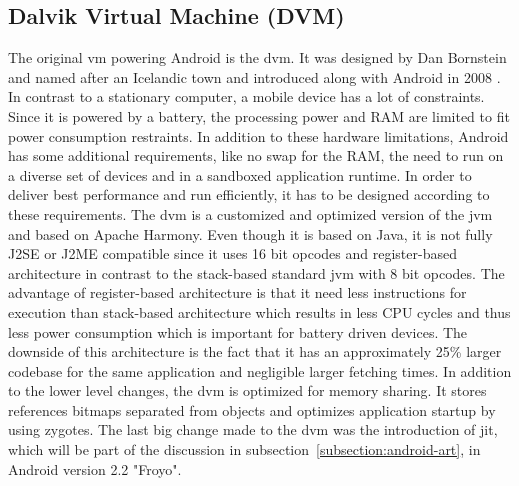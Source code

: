 \subsection{Dalvik Virtual Machine (DVM)} \label{subsection:android-dalvik}
The original \gls{vm} powering Android is the \gls{dvm}.
It was designed by Dan Bornstein and named after an Icelandic town and introduced along with Android in 2008 \cite{developersRelease}.
\newline
In contrast to a stationary computer, a mobile device has a lot of constraints.
Since it is powered by a battery, the processing power and RAM are limited to fit power consumption restraints.
In addition to these hardware limitations, Android has some additional requirements, like no swap for the RAM, the need to run on a diverse set of devices and in a sandboxed application runtime.
In order to deliver best performance and run efficiently, it has to be designed according to these requirements.
\newline
The \gls{dvm} is a customized and optimized version of the \gls{jvm} and based on Apache Harmony.
Even though it is based on Java, it is not fully J2SE or J2ME compatible since it uses 16 bit opcodes and register-based architecture in contrast to the stack-based standard \gls{jvm} with 8 bit opcodes.
The advantage of register-based architecture is that it need less instructions for execution than stack-based architecture which results in less CPU cycles and thus less power consumption which is important for battery driven devices.
The downside of this architecture is the fact that it has an approximately 25\% larger codebase for the same application and negligible larger fetching times.
In addition to the lower level changes, the \gls{dvm} is optimized for memory sharing.
It stores references bitmaps separated from objects and optimizes application startup by using zygotes. \cite{ehringerDalvik} \cite{andevconDalvikART}
\newline
The last big change made to the \gls{dvm} was the introduction of \gls{jit}, which will be part of the discussion in subsection~\ref{subsection:android-art}, in Android version 2.2 "Froyo".
